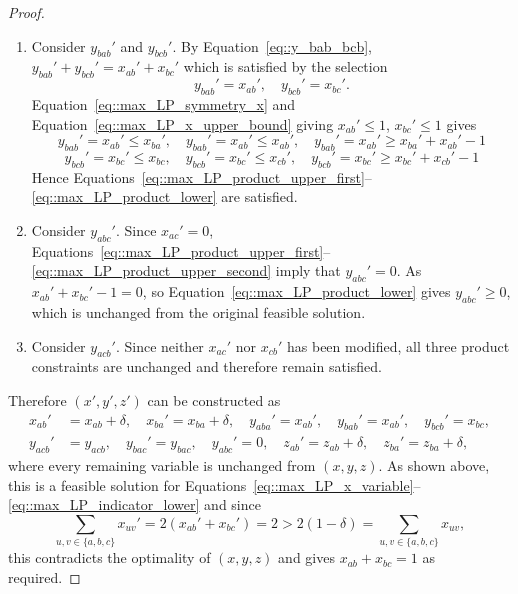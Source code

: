 \documentclass[11pt]{article}
\begin{document}
\begin{proof}
\begin{enumerate}[label=\Alph*.]
\begin{enumerate}[label=(\roman*)]
        \item Consider $y_{bab}'$ and $y_{bcb}'$. By Equation~\eqref{eq::y_bab_bcb}, $y_{bab}'+y_{bcb}'=x_{ab}'+x_{bc}'$ which is satisfied by the selection
          \[
          y_{bab}'=x_{ab}',\quad y_{bcb}'=x_{bc}'. 
          \] 
          Equation~\eqref{eq::max_LP_symmetry_x} and Equation~\eqref{eq::max_LP_x_upper_bound} giving $x_{ab}' \leq 1$, $x_{bc}' \leq 1$ gives
          \[
          y_{bab}'=x_{ab}' \leq x_{ba}',\quad y_{bab}'=x_{ab}'\leq x_{ab}', \quad y_{bab}'=x_{ab}' \geq x_{ba}'+x_{ab}'-1
          \]
          \[
          y_{bcb}'=x_{bc}' \leq x_{bc},\quad y_{bcb}'=x_{bc}' \leq x_{cb}', \quad y_{bcb}'=x_{bc}' \geq x_{bc}'+x_{cb}'-1
          \]
          Hence Equations~\eqref{eq::max_LP_product_upper_first}--\eqref{eq::max_LP_product_lower} are satisfied.
        \item Consider $y_{abc}'$. Since $x_{ac}'=0$, Equations~\eqref{eq::max_LP_product_upper_first}--\eqref{eq::max_LP_product_upper_second} imply that $
          y_{abc}'=0$. As $x_{ab}'+x_{bc}'-1=0$, so Equation~\eqref{eq::max_LP_product_lower} gives $y_{abc}'\ge0$, which is unchanged from the original feasible solution.  
        \item Consider $y_{acb}'$. Since neither $x_{ac}'$ nor $x_{cb}'$ has been modified, all three product constraints are unchanged and therefore remain
        satisfied.
      \end{enumerate}
  \end{enumerate}
  Therefore $(x',y',z')$ can be constructed as 
  \begin{align*}
  x_{ab}'&=x_{ab}+\delta,\quad x_{ba}'=x_{ba}+\delta,\quad y_{aba}'=x_{ab}',\quad y_{bab}'=x_{ab}',\quad y_{bcb}'=x_{bc},\\
  y_{acb}'&=y_{acb},\quad y_{bac}'=y_{bac},\quad  y_{abc}'=0,\quad z_{ab}'=z_{ab}+\delta,\quad z_{ba}'=z_{ba}+\delta,
  \end{align*}
  where every remaining variable is unchanged from $(x,y,z)$. As shown above, this is a feasible solution for Equations~\eqref{eq::max_LP_x_variable}--\eqref{eq::max_LP_indicator_lower} and since
  \[
  \sum_{u,v\in\{a,b,c\}}x_{uv}' = 2(x_{ab}'+x_{bc}') = 2 > 2(1-\delta) = \sum_{u,v\in\{a,b,c\}}x_{uv},
  \]
  this contradicts the optimality of $(x,y,z)$ and gives $x_{ab}+x_{bc}=1$ as required.
\end{proof}
\end{document}
